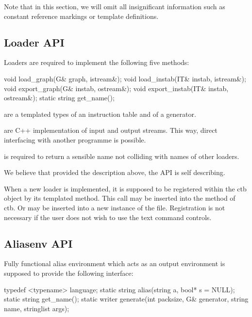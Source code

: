 Note that in this section, we will omit all insignificant information such as constant reference markings or template definitions.

\label{sec:apis}

\subsection{Loader API}

Loaders are required to implement the following five methods:

\mybeginfig
\begin{code}
void load_graph(G& graph, istream&);
void load_instab(IT& instab, istream&);
void export_graph(G& instab, ostream&);
void export_instab(IT& instab, ostream&);
static string get_name();
\end{code}

\begin{description}
\item {} are a templated types of an instruction table and of a generator.
\item {} are C++ implementation of input and output streams. This way, direct interfacing with another programme is possible.
\item {} is required to return a sensible name not colliding with names of other loaders.
\end{description}

We believe that provided the description above, the API is self describing.

When a new loader is implemented, it is supposed to be registered within the ctb object by its templated  method. This call may be inserted into the  method of ctb. Or may be inserted into a new instance of the  file. Registration is not necessary if the user does not wish to use the text command controls.

\subsection{Aliasenv API}

Fully functional alias environment which acts as an output environment is supposed to provide the following interface:

\mybeginfig
\begin{code}
typedef <typename> language;
static string alias(string a, bool* s = NULL);
static string get_name();
static writer generate(int packsize,  G& generator, 
  string name, stringlist args);
\end{code}

